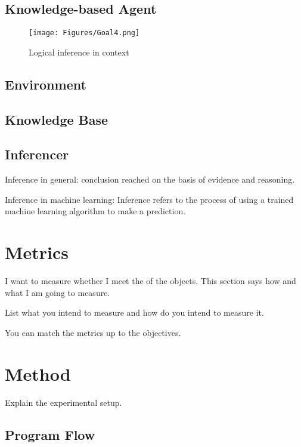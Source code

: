 \subsection{Knowledge-based Agent}
		
\begin{figure}[H]
    \centering
    \texttt{[image: Figures/Goal4.png]}
    \caption{Logical inference in context}
    \label{fig:inference_logic}
\end{figure}
	
\subsection{Environment}



\subsection{Knowledge Base}



\subsection{Inferencer}

Inference in general: conclusion reached on the basis of evidence and reasoning.

Inference in machine learning: Inference refers to the process of using a trained machine learning algorithm to make a prediction.




\section{Metrics}

I want to measure whether I meet the of the objects.
This section says how and what I am going to measure.

List what you intend to measure and how do you intend to measure it.

You can match the metrics up to the objectives.

\section{Method}

Explain the experimental setup.
\subsection{Program Flow}